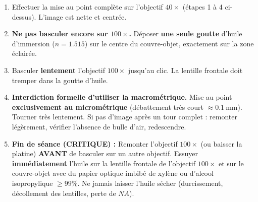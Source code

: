 \documentclass[11pt]{article}
\begin{document}
\begin{methode}[Mise au point à l'immersion (Objectif $100\times$ Huile -- Indice $n=\num{1,515}$)]
\begin{enumerate}
    \item Effectuer la mise au point complète sur l'objectif $40\times$ (étapes 1 à 4 ci-dessus). L'image est nette et centrée.
    \item \textbf{Ne pas basculer encore sur $100\times$.} Déposer \textbf{une seule goutte} d'huile d'immersion ($n=\num{1,515}$) sur le centre du couvre-objet, exactement sur la zone éclairée.
    \item Basculer \textbf{lentement} l'objectif $100\times$ jusqu'au clic. La lentille frontale doit tremper dans la goutte d'huile.
    \item \textbf{Interdiction formelle d'utiliser la macrométrique.} Mise au point \textbf{exclusivement au micrométrique} (débattement très court $\approx \SI{0,1}{\mm}$). Tourner très lentement. Si pas d'image après un tour complet : remonter légèrement, vérifier l'absence de bulle d'air, redescendre.
    \item \textbf{Fin de séance (CRITIQUE) :} Remonter l'objectif $100\times$ (ou baisser la platine) \textbf{AVANT} de basculer sur un autre objectif. Essuyer \textbf{immédiatement} l'huile sur la lentille frontale de l'objectif $100\times$ et sur le couvre-objet avec du papier optique imbibé de xylène ou d'alcool isopropylique $\ge 99\%$. Ne jamais laisser l'huile sécher (durcissement, décollement des lentilles, perte de $NA$).
\end{enumerate}
\end{methode}
\end{document}

